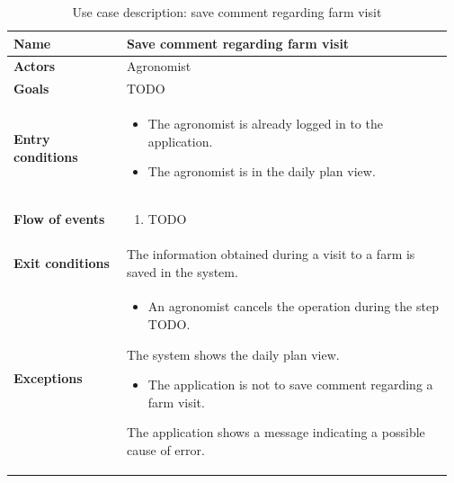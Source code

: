 \begin{table}[H]
    \centering
	\begin{tabular}{@{}p{0.25\linewidth} p{0.72\linewidth}@{}}
        \toprule
		\textbf{Name}               & Save comment regarding farm visit\\
		\midrule
		\textbf{Actors}             & Agronomist\\
		\midrule
		\textbf{Goals}              & TODO \\
		\midrule
		
		\textbf{Entry conditions}   & \begin{itemize}[leftmargin=.4cm,noitemsep,topsep=0pt,before=\vspace{-3mm},after=\vspace{-4mm}]
		    \item The agronomist is already logged in to the application.
		    \item The agronomist is in the daily plan view.
		\end{itemize}\\
		\midrule
		
		\textbf{Flow of events}     & \begin{enumerate}[leftmargin=.4cm,noitemsep,topsep=0pt,before=\vspace{-3mm},after=\vspace{-4mm}]
		    \item TODO 
		\end{enumerate}\\
		\midrule
		\textbf{Exit conditions}    & The information obtained during a visit to a farm is saved in the system. \\
		\midrule
		
		\textbf{Exceptions}         & \begin{itemize}[leftmargin=.4cm,noitemsep,topsep=0pt,before=\vspace{-3mm}]
		    \item An agronomist cancels the operation during the step TODO.
		\end{itemize}
	    The system shows the daily plan view.
	    \begin{itemize}[leftmargin=.4cm,noitemsep,topsep=0pt]
		   \item The application is not to save comment regarding a farm visit. 
		\end{itemize}
		The application shows a message indicating a possible cause of error.
		\\ \bottomrule
	\end{tabular}
	\caption{Use case description: save comment regarding farm visit} 
\end{table}

